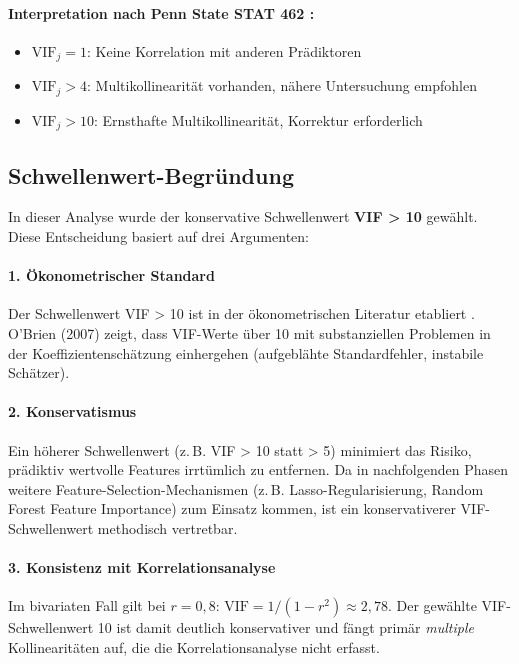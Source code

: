 \paragraph{Interpretation nach Penn State STAT 462 \parencite{pennstate2024vif}:}
\begin{itemize}[topsep=0.2\baselineskip]
    \item $\text{VIF}_j = 1$: Keine Korrelation mit anderen Prädiktoren
    \item $\text{VIF}_j > 4$: Multikollinearität vorhanden, nähere Untersuchung empfohlen
    \item $\text{VIF}_j > 10$: Ernsthafte Multikollinearität, Korrektur erforderlich
\end{itemize}

\subsection{Schwellenwert-Begründung}

In dieser Analyse wurde der konservative Schwellenwert \textbf{VIF > 10} gewählt. Diese Entscheidung basiert auf drei Argumenten:

\paragraph{1. Ökonometrischer Standard} Der Schwellenwert VIF > 10 ist in der ökonometrischen Literatur etabliert \parencite{obrien2007caution, pennstate2024vif}. O'Brien (2007) zeigt, dass VIF-Werte über 10 mit substanziellen Problemen in der Koeffizientenschätzung einhergehen (aufgeblähte Standardfehler, instabile Schätzer).

\paragraph{2. Konservatismus} Ein höherer Schwellenwert (z.\,B. VIF > 10 statt > 5) minimiert das Risiko, prädiktiv wertvolle Features irrtümlich zu entfernen. Da in nachfolgenden Phasen weitere Feature-Selection-Mechanismen (z.\,B. Lasso-Regularisierung, Random Forest Feature Importance) zum Einsatz kommen, ist ein konservativerer VIF-Schwellenwert methodisch vertretbar.

\paragraph{3. Konsistenz mit Korrelationsanalyse} Im bivariaten Fall gilt bei $r=0{,}8$: $\text{VIF}=1/(1-r^2)\approx2{,}78$. Der gewählte VIF-Schwellenwert 10 ist damit deutlich konservativer und fängt primär \textit{multiple} Kollinearitäten auf, die die Korrelationsanalyse nicht erfasst.

